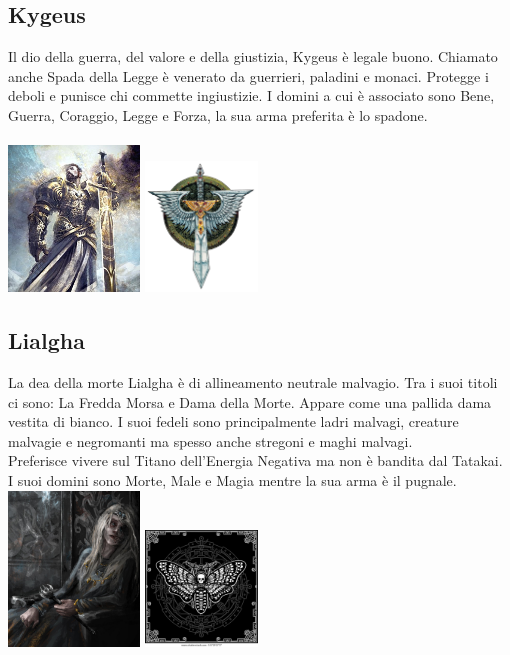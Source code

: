 \documentclass[10pt, a4paper]{report}
\begin{document}
\begin{multicols}{2}
\subsection*{Kygeus}
Il dio della guerra, del valore e della giustizia, Kygeus è legale buono. Chiamato anche Spada della Legge è venerato da guerrieri, paladini e monaci.
Protegge i deboli e punisce chi commette ingiustizie. 
I domini a cui è associato sono Bene, Guerra, Coraggio, Legge e Forza, la sua arma preferita è lo spadone.\\
\\
\includegraphics[width = 3.5cm]{kygeus.jpeg}
\includegraphics[width = 3cm]{kygeus_simbolo.jpg}
\subsection*{Lialgha}
La dea della morte Lialgha è di allineamento neutrale malvagio. Tra i suoi titoli ci sono: La Fredda Morsa e Dama della Morte. Appare come una pallida dama vestita di bianco. I suoi fedeli sono principalmente ladri malvagi, creature malvagie e negromanti ma spesso anche stregoni e maghi malvagi.\\
Preferisce vivere sul Titano dell'Energia Negativa ma non è bandita dal Tatakai. I suoi domini sono Morte, Male e Magia mentre la sua arma è il pugnale.
\\
\includegraphics[width=3.5cm]{lialgha.jpeg}
\includegraphics[width=3cm]{lialgha_simbolo.jpeg}

\end{multicols}
\end{document}
